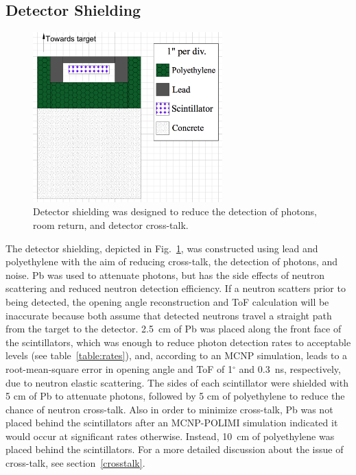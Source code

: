 \subsection{Detector Shielding}
\label{shielding}
\begin{figure}
    \centering
    \includegraphics[width = 0.65\textwidth]{Content/Methods/DetShielding.png}
    \caption{Detector shielding was designed to reduce the detection of photons, room return, and detector cross-talk.}
    \label{fig:shielding}
\end{figure}
The detector shielding, depicted in Fig.~\ref{fig:shielding}, was constructed using lead and polyethylene with the aim of reducing cross-talk, the detection of photons, and noise.
Pb was used to attenuate photons, but has the side effects of neutron scattering and reduced neutron detection efficiency.
If a neutron scatters prior to being detected, the opening angle reconstruction and ToF calculation will be inaccurate because both assume that detected neutrons travel a straight path from the target to the detector.
2.5~cm of Pb was placed along the front face of the scintillators, which was enough to reduce photon detection rates to acceptable levels (see table~\ref{table:rates}), and, according to an MCNP simulation, leads to a root-mean-square error in opening angle and ToF of 1$^{\circ}$ and 0.3~ns, respectively, due to neutron elastic scattering.
The sides of each scintillator were shielded with 5 cm of Pb to attenuate photons, followed by 5 cm of polyethylene to reduce the chance of neutron cross-talk.
Also in order to minimize cross-talk, Pb was not placed behind the scintillators after an MCNP-POLIMI simulation indicated it would occur at significant rates otherwise.
Instead, 10~cm of polyethylene was placed behind the scintillators.
For a more detailed discussion about the issue of cross-talk, see section~\ref{crosstalk}.

